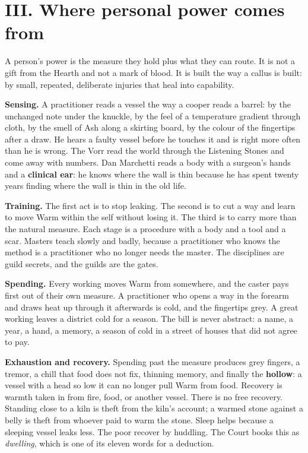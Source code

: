 \documentclass{design/chronicle}
\begin{document}
\section*{III. Where personal power comes from}

A person’s power is the measure they hold plus what they can route. It is not a gift from the Hearth and not a mark of blood. It is built the way a callus is built: by small, repeated, deliberate injuries that heal into capability.

\textbf{Sensing.} A practitioner reads a vessel the way a cooper reads a barrel: by the unchanged note under the knuckle, by the feel of a temperature gradient through cloth, by the smell of Ash along a skirting board, by the colour of the fingertips after a draw. He hears a faulty vessel before he touches it and is right more often than he is wrong. The Vorr read the world through the Listening Stones and come away with numbers. Dan Marchetti reads a body with a surgeon’s hands and a \textbf{clinical ear}: he knows where the wall is thin because he has spent twenty years finding where the wall is thin in the old life.

\textbf{Training.} The first act is to stop leaking. The second is to cut a way and learn to move Warm within the self without losing it. The third is to carry more than the natural measure. Each stage is a procedure with a body and a tool and a scar. Masters teach slowly and badly, because a practitioner who knows the method is a practitioner who no longer needs the master. The disciplines are guild secrets, and the guilds are the gates.

\textbf{Spending.} Every working moves Warm from somewhere, and the caster pays first out of their own measure. A practitioner who opens a way in the forearm and draws heat up through it afterwards is cold, and the fingertips grey. A great working leaves a district cold for a season. The bill is never abstract: a name, a year, a hand, a memory, a season of cold in a street of houses that did not agree to pay.

\textbf{Exhaustion and recovery.} Spending past the measure produces grey fingers, a tremor, a chill that food does not fix, thinning memory, and finally the \textbf{hollow}: a vessel with a head so low it can no longer pull Warm from food. Recovery is warmth taken in from fire, food, or another vessel. There is no free recovery. Standing close to a kiln is theft from the kiln’s account; a warmed stone against a belly is theft from whoever paid to warm the stone. Sleep helps because a sleeping vessel leaks less. The poor recover by huddling. The Court books this as \emph{dwelling}, which is one of its eleven words for a deduction.
\end{document}
